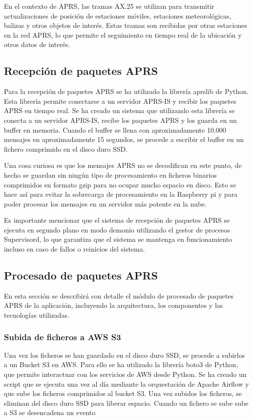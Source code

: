 En el contexto de APRS, las tramas AX.25 se utilizan para transmitir actualizaciones de posición de estaciones móviles, estaciones meteorológicas, balizas y otros objetos de interés. Estas tramas son recibidas por otras estaciones en la red APRS, lo que permite el seguimiento en tiempo real de la ubicación y otros datos de interés.

\subsection*{Recepción de paquetes APRS}

Para la recepción de paquetes APRS se ha utilizado la librería aprslib de Python. Esta librería permite conectarse a un servidor APRS-IS y recibir los paquetes APRS en tiempo real. Se ha creado un sistema que utilizando esta librería se conecta a un servidor APRS-IS, recibe los paquetes APRS y los guarda en un buffer en memoria. Cuando el buffer se llena con aproximadamente 10.000 mensajes en aproximadamente 15 segundos, se procede a escribir el buffer en un fichero comprimido en el disco duro SSD.

Una cosa curiosa es que los mensajes APRS no se decodifican en este punto, de hecho se guardan sin ningún tipo de procesamiento en ficheros binarios comprimidos en formato gzip para no ocupar mucho espacio en disco. Esto se hace así para evitar la sobrecarga de procesamiento en la Raspberry pi y para poder procesar los mensajes en un servidor más potente en la nube.

Es importante mencionar que el sistema de recepción de paquetes APRS se ejecuta en segundo plano en modo demonio utilizando el gestor de procesos Supervisord, lo que garantiza que el sistema se mantenga en funcionamiento incluso en caso de fallos o reinicios del sistema.

\subsection*{Procesado de paquetes APRS}
En esta sección se describirá con detalle el módulo de procesado de paquetes APRS de la aplicación, incluyendo la arquitectura, los componentes y las tecnologías utilizadas.

\subsubsection*{Subida de ficheros a AWS S3}

Una vez los ficheros se han guardado en el disco duro SSD, se procede a subirlos a un Bucket S3 en AWS. Para ello se ha utilizado la librería boto3 de Python, que permite interactuar con los servicios de AWS desde Python. Se ha creado un script que se ejecuta una vez al día mediante la orquestación de Apache Airflow y que sube los ficheros comprimidos al bucket S3. Una vez subidos los ficheros, se eliminan del disco duro SSD para liberar espacio. Cuando un fichero se sube sube a S3 se desencadena un evento

